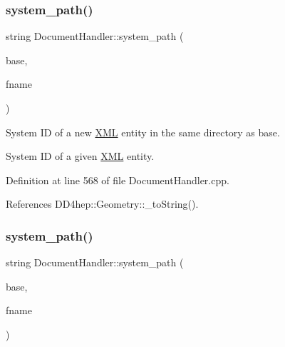 \subsubsection{\texorpdfstring{system\+\_\+path()}{system\_path()}\hspace{0.1cm}{\footnotesize\ttfamily [2/3]}}
{\footnotesize\ttfamily string Document\+Handler\+::system\+\_\+path (\begin{DoxyParamCaption}\item[{\hyperlink{class_d_d4hep_1_1_x_m_l_1_1_handle__t}{Handle\+\_\+t}}]{base,  }\item[{const \hyperlink{namespace_d_d4hep_1_1_x_m_l_a09e5d9cc86ed782f6826dfe0778c1815}{Xml\+Char} $\ast$}]{fname }\end{DoxyParamCaption})\hspace{0.3cm}{\ttfamily [static]}}



System ID of a new \hyperlink{namespace_d_d4hep_1_1_x_m_l}{X\+ML} entity in the same directory as base. 

System ID of a given \hyperlink{namespace_d_d4hep_1_1_x_m_l}{X\+ML} entity. 

Definition at line 568 of file Document\+Handler.\+cpp.



References D\+D4hep\+::\+Geometry\+::\+\_\+to\+String().

\hypertarget{class_d_d4hep_1_1_x_m_l_1_1_document_handler_a1b297ff3de62b00132c1034560c65886}{}\label{class_d_d4hep_1_1_x_m_l_1_1_document_handler_a1b297ff3de62b00132c1034560c65886} 
\subsubsection{\texorpdfstring{system\+\_\+path()}{system\_path()}\hspace{0.1cm}{\footnotesize\ttfamily [3/3]}}
{\footnotesize\ttfamily string Document\+Handler\+::system\+\_\+path (\begin{DoxyParamCaption}\item[{\hyperlink{class_d_d4hep_1_1_x_m_l_1_1_handle__t}{Handle\+\_\+t}}]{base,  }\item[{const std\+::string \&}]{fname }\end{DoxyParamCaption})\hspace{0.3cm}{\ttfamily [static]}}



